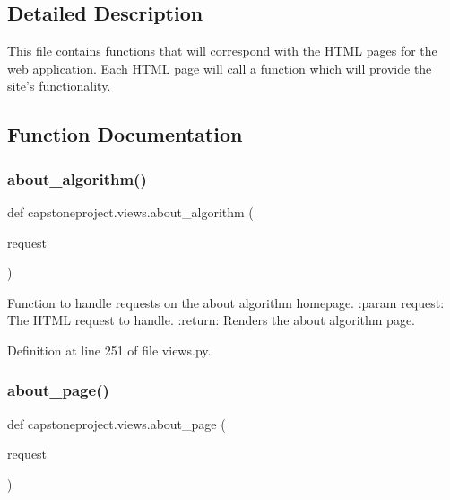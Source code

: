 \subsection{Detailed Description}
\begin{DoxyVerb}This file contains functions that will correspond with the HTML pages for the
web application. Each HTML page will call a function which will provide the
site's functionality.
\end{DoxyVerb}
 

\subsection{Function Documentation}
\mbox{\label{namespacecapstoneproject_1_1views_aebf902e0c512912c97f62c7349714d4b}} 
\subsubsection{\texorpdfstring{about\+\_\+algorithm()}{about\_algorithm()}}
{\footnotesize\ttfamily def capstoneproject.\+views.\+about\+\_\+algorithm (\begin{DoxyParamCaption}\item[{}]{request }\end{DoxyParamCaption})}

\begin{DoxyVerb}Function to handle requests on the about algorithm homepage.
:param request: The HTML request to handle.
:return: Renders the about algorithm page.
\end{DoxyVerb}
 

Definition at line 251 of file views.\+py.

\mbox{\label{namespacecapstoneproject_1_1views_ae4926974b5a54e75ad132ef6b6a68681}} 
\subsubsection{\texorpdfstring{about\+\_\+page()}{about\_page()}}
{\footnotesize\ttfamily def capstoneproject.\+views.\+about\+\_\+page (\begin{DoxyParamCaption}\item[{}]{request }\end{DoxyParamCaption})}

